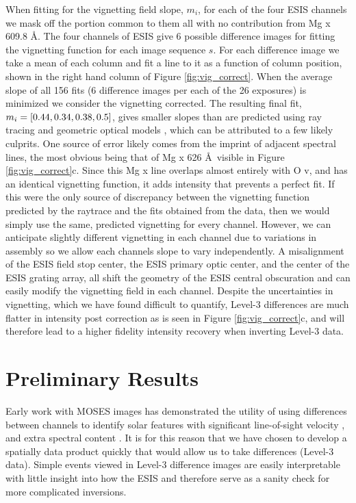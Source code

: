         When fitting for the vignetting field slope, $m_i$, for each  of the four ESIS channels we mask off the portion common to them all with no contribution from Mg {\sc x} 609.8 \AA.
        The four channels of ESIS give 6 possible difference images for fitting the vignetting function for each image sequence $s$. 
        For each difference image we take a mean of each column and fit a line to it as a function of column position, shown in the right hand column of Figure \ref{fig:vig_correct}.
        When the average slope of all 156 fits (6 difference images per each of the 26 exposures) is minimized we consider the vignetting corrected. 
        The resulting final fit, $m_i = [0.44, 0.34, 0.38, 0.5]$, gives smaller slopes than are predicted using ray tracing and geometric optical models \citep{ESIS}, which can be attributed to a few likely culprits.
        One source of error likely comes from the imprint of adjacent spectral lines, the most obvious being that of Mg {\sc x} 626 \AA \ visible in Figure \ref{fig:vig_correct}c.
        Since this Mg {\sc x} line overlaps almost entirely with O {\sc v}, and has an identical vignetting function, it adds intensity that prevents a perfect fit. 
        If this were the only source of discrepancy between the vignetting function predicted by the raytrace and the fits obtained from the data, then we would simply use the same, predicted vignetting for every channel. 
        However, we can anticipate slightly different vignetting in each channel due to variations in assembly so we allow each channels slope to vary independently.
        A misalignment of the ESIS field stop center, the ESIS primary optic center, and the center of the ESIS grating array, all shift the geometry of the ESIS central obscuration and can easily modify the vignetting field in each channel.
        Despite the uncertainties in vignetting, which we have found difficult to quantify, Level-3 differences are much flatter in intensity post correction as is seen in Figure \ref{fig:vig_correct}c, and will therefore lead to a higher fidelity intensity recovery when inverting Level-3 data.
        

  

\section{Preliminary Results}

	
	Early work with MOSES images has demonstrated the utility of using differences between channels to identify solar features with significant line-of-sight velocity \citep{Fox2010,FoxPhD,RustPhD,Rust2019}, and extra spectral content \citep{RustPhD, Rust2019,Parker2021}.  
	It is for this reason that we have chosen to develop a spatially data product quickly that would allow us to take differences (Level-3 data).  
	Simple events viewed in Level-3 difference images are easily interpretable with little insight into how the ESIS and therefore serve as a sanity check for more complicated inversions. 
	
